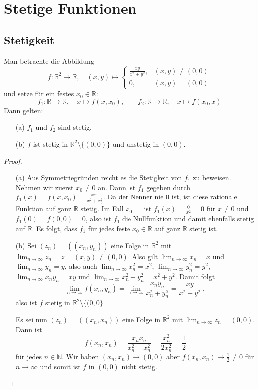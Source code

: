 \chapter{Stetige Funktionen}
\section{Stetigkeit}
\setcounter{aufgabe}{10}
\begin{aufgabe}
	Man betrachte die Abbildung
	\[
		f: \mathbb R^2 \to \mathbb R, \quad
			(x, y) \mapsto 
			\begin{cases}
				\frac{xy}{x^2 + y^2}, & (x,y) \neq (0,0) \\
				0, & (x,y) = (0,0)
			\end{cases}
	\]
	und setze für ein festes $x_0 \in \mathbb R$:
	\[
		f_1: \mathbb R \to \mathbb R, \quad x \mapsto f(x, x_0), \qquad 
		f_2: \mathbb R \to \mathbb R, \quad x \mapsto f(x_0, x)
	\]
	Dann gelten:
	\begin{enumerate}
		\item[(a)] $f_1$ und $f_2$ sind stetig.
		\item[(b)] $f$ ist stetig in $\mathbb R^2 \setminus \{(0,0)\}$ und unstetig in
			$(0,0)$.
	\end{enumerate}
\end{aufgabe}
\begin{proof}
	\begin{enumerate}
		\item[(a)] Aus Symmetriegründen reicht es die Stetigkeit von $f_1$ zu beweisen.
			Nehmen wir zuerst $x_0 \neq 0$ an. Dann ist $f_1$ gegeben durch 
			$f_1(x) = f(x, x_0) = \frac{x x_0}{x^2 + x_0^2}$. Da der Nenner nie $0$ ist, 
			ist diese rationale Funktion auf ganz $\mathbb R$ stetig. Im Fall $x_0 = $ ist
			$f_1(x) = \frac{0}{x^2} = 0$ für $x \neq 0$ und $f_1(0) = f(0,0) = 0$, also ist $f_1$
			die Nullfunktion und damit ebenfalls stetig auf $\mathbb R$. Es folgt, dass 
			$f_1$ für jedes feste $x_0 \in \mathbb R$ auf ganz $\mathbb R$ stetig ist.
		\item[(b)] Sei $(z_n) = ( (x_n, y_n) )$ eine Folge in $\mathbb R^2$ mit 
			$\displaystyle \lim_{n \to \infty} z_n = z = (x,y) \neq (0,0)$. Also gilt
			$\displaystyle \lim_{n \to \infty} x_n = x$ und 
			$\displaystyle \lim_{n \to \infty} y_n = y$, also auch
			$\displaystyle \lim_{n \to \infty} x_n^2 = x^2$, 
			$\displaystyle \lim_{n \to \infty} y_n^2 = y^2$, 
			$\displaystyle \lim_{n \to \infty} x_n y_n = xy$ und
			$\displaystyle \lim_{n \to \infty} x_n^2 + y_n^2 = x^2 + y^2$.
			Damit folgt
			\[
				\lim_{n \to \infty} f(x_n, y_n) = \lim_{n \to \infty} \frac{ x_n y_n }{x_n^2 + y_n^2}
					= \frac{xy}{x^2 + y^2} \ ,
			\]
			also ist $f$ stetig in $\mathbb R^2 \setminus \{ (0,0 \}$

			Es sei nun $(z_n) = ( (x_n, x_n) )$ eine Folge in $\mathbb R^2$ mit
			$\displaystyle \lim_{n \to \infty} z_n = (0,0)$.
			Dann ist
			\[
				f( x_n, x_n ) = \frac{ x_n x_n }{x_n^2 + x_n^2} = \frac{x_n^2}{2 x_n^2} = \frac 1 2
			\]
			für jedes $n \in \mathbb N$.
			Wir haben $(x_n, x_n) \to (0, 0)$ aber $f(x_n, x_n) \to \frac 1 2 \neq 0$ für 
			$n \to \infty$ und somit ist $f$ in $(0,0)$ nicht stetig.
	\end{enumerate}
\end{proof}
